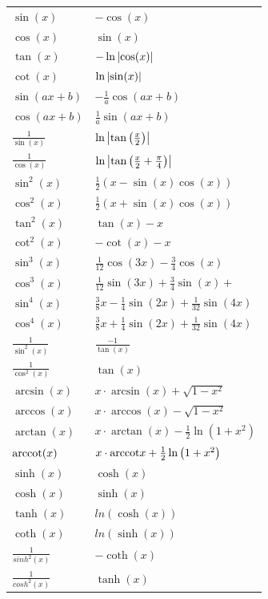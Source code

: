 \documentclass[a4paper]{article}
\begin{document}
\begin{appendix}
\begin{fmerke}
\begin{multicols}{2}
\begin{tabular}{l|l}
					$\sin(x)$            &  $-\cos(x)$ \\
					$\cos(x)$            &  $\sin(x)$ \\
					$\tan(x)$            &  $-\ln\left|\cos(x)\right|$ \\
					$\cot(x)$                   &   $\ln\left|\sin(x)\right|$\\
					$\sin{\left(ax+b\right)}$            &  $-\frac{1}{a}\cos{\left(ax+b\right)}$ \\
					$\cos{\left(ax+b\right)}$            &  $\frac{1}{a}\sin{\left(ax+b\right)}$ \\
					$\frac{1}{\sin(x)}$            &  $\ln\left|\tan\left(\frac{x}{2}\right)\right|$ \\
					$\frac{1}{\cos(x)}$            &  $\ln\left|\tan\left(\frac{x}{2}+\frac{\pi}{4}\right)\right|$ \\
					$\sin^2(x)$            &  $\frac{1}{2}(x-\sin(x)\cos(x))$ \\
					$\cos^2(x)$            &  $\frac{1}{2}(x+\sin(x)\cos(x))$ \\
					$\tan^2(x)$            &  $\tan(x)-x$ \\
					$\cot^2(x)$            &  $-\cot(x)-x$ \\
					$\sin^3(x)$			   &  $\frac{1}{12}\cos(3x) - \frac{3}{4}\cos(x)$\\
					$\cos^3(x)$			   &  $\frac{1}{12}\sin(3x) + \frac{3}{4}\sin(x)+ $\\
					$\sin^4(x)$			   &  $\frac{3}{8}x - \frac{1}{4}\sin(2x)+ \frac{1}{32}\sin(4x)$\\
					$\cos^4(x)$			   &  $\frac{3}{8}x + \frac{1}{4}\sin(2x)+\frac{1}{32}\sin(4x)$\\
					$\frac{1}{\sin^2(x)}$       &   $\frac{-1}{\tan(x)}$\\
					$\frac{1}{\cos^2(x)}$       &   $\tan(x)$   \\

					$\arcsin(x)$            &  $x\cdot \arcsin(x)+\sqrt{1-x^2}$ \\
					$\arccos(x)$            &  $x\cdot \arccos(x)-\sqrt{1-x^2}$ \\
					$\arctan(x)$            &  $x\cdot \arctan(x)-\frac{1}{2}\ln{\left(1+x^2\right)}$ \\

					$\text{arccot}(x)$            &  $x\cdot \text{arccot}{x}+\frac{1}{2}\ln{\left(1+x^2\right)}$ \\

					$\sinh(x)$            &  $\cosh(x)$ \\
					$\cosh(x)$            &  $\sinh(x)$ \\
					$\tanh(x)$            &  $ln{\left(\cosh(x)\right)}$ \\
					$\coth(x)$            &  $ln{\left(\sinh(x)\right)}$ \\
					$\frac{1}{sinh^2(x)}$       &   $-\coth(x)$\\
					$\frac{1}{cosh^2(x)}$       &   $\tanh(x)$\\


\end{tabular}
\end{multicols}
\end{fmerke}
\end{appendix}
\end{document}
